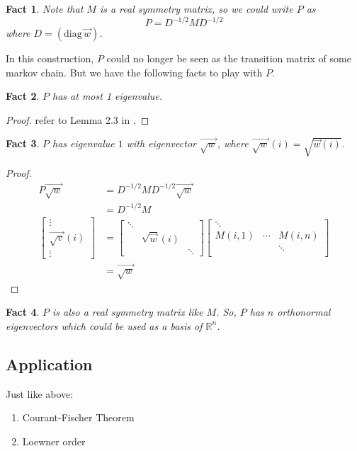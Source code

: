 \documentclass{article}
\newtheorem{fact}{Fact}[section]
\def\diag#1{(\mathrm{diag}\,#1)}
\begin{document}
\begin{fact}
  Note that $M$ is a real symmetry matrix, so we could write $P$ as
  \[P = D^{-1/2}MD^{-1/2}\]
  where $D = \diag{\vec{w}}$.
\end{fact}
  In this construction, $P$ could no longer be seen as the transition matrix of some markov chain. But we have the following facts to play with $P$.
\begin{fact}
  $P$ has at most 1 eigenvalue.
\end{fact}
\begin{proof}
  refer to Lemma 2.3 in \cite{anari2019log}.
\end{proof}
\begin{fact}
  $P$ has eigenvalue $1$ with eigenvector $\vec{\sqrt{w}}$, where $\vec{\sqrt{w}}(i) = \sqrt{\vec{w}(i)}$.
\end{fact}
\begin{proof}
  \begin{align*}
    P\vec{\sqrt{w}}
    &= D^{-1/2}MD^{-1/2}\vec{\sqrt{w}} \\
    &= D^{-1/2}M\\
    \left[
    \begin{array}{c}
      \vdots \\
      \vec{\sqrt{v}}(i) \\
      \vdots
    \end{array}
    \right]
    &= \left[
      \begin{array}{ccc}
        \ddots&& \\
        &\sqrt{\vec{w}}(i)&\\
        &&\ddots
      \end{array}
      \right]
    \left[
           \begin{array}{ccc}
             \ddots &   &  \\
             M(i, 1) & \cdots & M(i, n) \\
              &  &  \ddots\\
           \end{array}
    \right] \\
    &= \vec{\sqrt{w}}
  \end{align*}
\end{proof}

\begin{fact}
  $P$ is also a real symmetry matrix like $M$.
  So, $P$ has $n$ orthonormal eigenvectors which could be used as a basis of $\mathbb{R}^n$.
\end{fact}

\subsection{Application}
Just like above:
\begin{enumerate}
\item Courant-Fischer Theorem
\item Loewner order
\end{enumerate}
\end{document}
